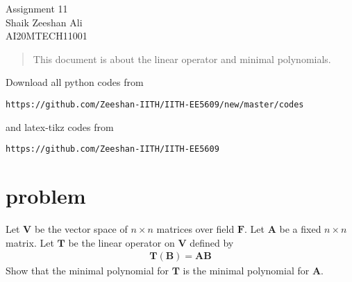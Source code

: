 \documentclass[journal,12pt,twocolumn]{IEEEtran}
\providecommand{\brak}[1]{\ensuremath{\left(#1\right)}}
\numberwithin{equation}{subsection}
\let\vec\mathbf
\begin{document}
\begin{center}
\huge Assignment 11\\

\large Shaik Zeeshan Ali\\
\large AI20MTECH11001\\
\end{center}
\begin{abstract}
This document is about the linear operator and minimal polynomials.
\end{abstract}
Download all python codes from 
\begin{lstlisting}
https://github.com/Zeeshan-IITH/IITH-EE5609/new/master/codes
\end{lstlisting}

and latex-tikz codes from 
\begin{lstlisting}
https://github.com/Zeeshan-IITH/IITH-EE5609
\end{lstlisting}
\section{problem}
Let $\vec{V}$ be the vector space of $n\times n$ matrices over field $\vec{F}$. Let $\vec{A}$ be a fixed $n\times n$ matrix. Let $\vec{T}$ be the linear operator on $\vec{V}$ defined by
\begin{align}
    \vec{T\brak{B}}=\vec{AB}
\end{align}
Show that the minimal polynomial for $\vec{T}$ is the minimal polynomial for $\vec{A}$.
\end{document}
